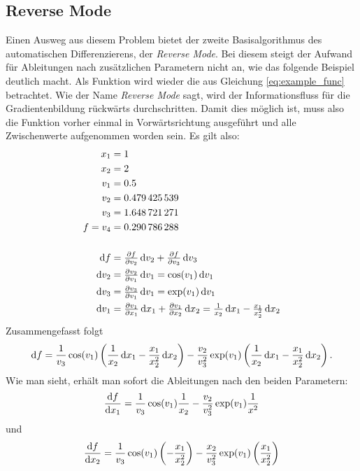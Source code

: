 \documentclass{scrartcl}
\begin{document}
\subsection{Reverse Mode}
Einen Ausweg aus diesem Problem bietet der zweite Basisalgorithmus des automatischen Differenzierens, der \emph{Reverse Mode}. Bei diesem steigt der Aufwand für Ableitungen nach zusätzlichen Parametern nicht an, wie das folgende Beispiel deutlich macht. Als Funktion wird wieder die aus Gleichung \ref{eq:example_func} betrachtet. Wie der Name \emph{Reverse Mode} sagt, wird der Informationsfluss für die Gradientenbildung rückwärts durchschritten. Damit dies möglich ist, muss also die Funktion vorher einmal in Vorwärtsrichtung ausgeführt und alle Zwischenwerte aufgenommen worden sein. Es gilt also:
\begin{equation*}
	\begin{aligned}
		x_1 &= 1 \\
		x_2 &= 2 \\
		v_1 &= \num{0,5} \\
		v_2 &= \num{0.479425539} \\
		v_3 &= \num{1.648721271} \\
		f = v_4 &= \num{0.290786288} \\[0.5cm]
		\dif f &= \tfrac{\partial f}{\partial v_2} \dif v_2 +  \tfrac{\partial f}{\partial v_3} \dif v_3 \\
		\dif v_2 &= \tfrac{\partial v_2}{\partial v_1} \dif v_1 = \cos(v_1) \dif v_1 \\
		\dif v_3 &= \tfrac{\partial v_3}{\partial v_1} \dif v_1 = \exp(v_1) \dif v_1 \\
		\dif v_1 &= \tfrac{\partial v_1}{\partial x_1} \dif x_1 + \tfrac{\partial v_1}{\partial x_2} \dif x_2 = \tfrac{1}{x_2} \dif x_1 - \tfrac{x_1}{x_2^2} \dif x_2
	\end{aligned}
\end{equation*}
Zusammengefasst folgt
\begin{equation}
	\mathop{}\!\mathrm{d} f = \frac{1}{v_3}\cos(v_1)\left(\frac{1}{x_2} \mathop{}\!\mathrm{d} x_1 - \frac{x_1}{x_2^2}\mathop{}\!\mathrm{d} x_2\right) - \frac{v_2}{v_3^2}\exp(v_1)\left(\frac{1}{x_2}\mathop{}\!\mathrm{d} x_1 - \frac{x_1}{x_2^2}\mathop{}\!\mathrm{d} x_2\right).
\end{equation}
Wie man sieht, erhält man sofort die Ableitungen nach den beiden Parametern:
\begin{equation}
	\frac{\mathop{}\!\mathrm{d} f}{\mathop{}\!\mathrm{d} x_1} = \frac{1}{v_3}\cos(v_1)\frac{1}{x_2} - \frac{v_2}{v_3^2}\exp(v_1)\frac{1}{x^2}
\end{equation}
und
\begin{equation}
	\frac{\mathop{}\!\mathrm{d} f}{\mathop{}\!\mathrm{d} x_2} = \frac{1}{v_3}\cos(v_1)\left(-\frac{x_1}{x_2^2}\right) - \frac{x_2}{v_3^2}\exp(v_1)\left(\frac{x_1}{x_2^2}\right)
\end{equation}
\end{document}
